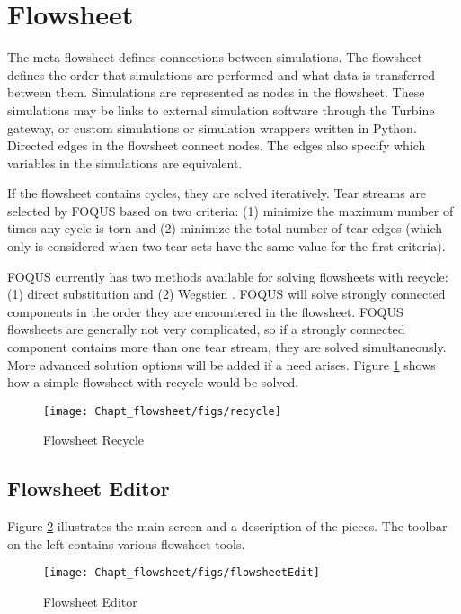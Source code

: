 \section{Flowsheet}
\label{section.flowsheet}

The meta-flowsheet defines connections between simulations. The flowsheet defines the order that simulations are performed and what data is transferred between them.  Simulations are represented as nodes in the flowsheet. These simulations may be links to external simulation software through the Turbine gateway, or custom simulations or simulation wrappers written in Python. Directed edges in the flowsheet connect nodes. The edges also specify which variables in the simulations are equivalent.  

If the flowsheet contains cycles, they are solved iteratively. Tear streams are selected by FOQUS based on two criteria: (1) minimize the maximum number of times any cycle is torn and (2) minimize the total number of tear edges (which only is considered when two tear sets have the same value for the first criteria).

FOQUS currently has two methods available for solving flowsheets with recycle: (1) direct substitution and (2) Wegstien \citep{Wegstein_1958}. FOQUS will solve strongly connected components in the order they are encountered in the flowsheet. FOQUS flowsheets are generally not very complicated, so if a strongly connected component contains more than one tear stream, they are solved simultaneously.  More advanced solution options will be added if a need arises. Figure \ref{fig.flowsheet.recycle} shows how a simple flowsheet with recycle would be solved.
\begin{figure}[H]
	\begin{center}
		\texttt{[image: Chapt\_flowsheet/figs/recycle]}
		\caption{Flowsheet Recycle}
		\label{fig.flowsheet.recycle}
	\end{center}
\end{figure}

\subsection{Flowsheet Editor}
Figure \ref{fig.flowsheet.editor} illustrates the main  screen and a description of the pieces. The toolbar on the left contains various flowsheet tools.
\begin{figure}[H]
	\begin{center}
		\texttt{[image: Chapt\_flowsheet/figs/flowsheetEdit]}
		\caption{Flowsheet Editor}
		\label{fig.flowsheet.editor}
	\end{center}
\end{figure}

